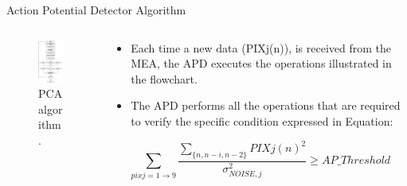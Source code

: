 \documentclass{beamer}
\begin{document}
\begin{frame}{Action Potential Detector Algorithm}

    \begin{columns}
        \begin{column}{0.35\textwidth}
            \begin{figure}
                \vspace{-0.2cm}
                \includegraphics[width=4cm]{PCA_Algorithm.png}
                \caption{PCA algorithm.}
            \end{figure}
        \end{column}
        \hspace{-0.6cm}
        \begin{column}{0.7\textwidth}
            \begin{itemize}
            	\item Each time a new data (PIXj(n)), is received from the MEA, the APD executes the operations illustrated in the flowchart.
                \item The APD performs all the operations that are required to verify the specific condition expressed in Equation:
            \end{itemize}
            \begin{small}
            \begin{equation}
                \sum_{pixj=1\xrightarrow{}9} \frac{\sum_{ \{ n,n-i,n-2 \} } PIXj (n)^2 }{\sigma_{NOISE,j}^2} \geq AP\_Threshold \nonumber
            \end{equation}
            \end{small}
        \end{column}
    \end{columns}
\end{frame}
\end{document}
